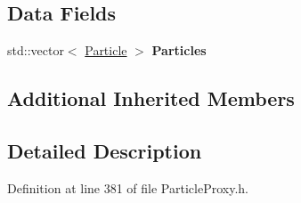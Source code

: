 \subsection*{Data Fields}
\begin{DoxyCompactItemize}
\item 
std\+::vector$<$ \hyperlink{class_particle}{Particle} $>$ {\bfseries Particles}\hypertarget{class_snow_particle_proxy_a3a46d5c4f047110ed32894f64cdfe5a7}{}\label{class_snow_particle_proxy_a3a46d5c4f047110ed32894f64cdfe5a7}

\end{DoxyCompactItemize}
\subsection*{Additional Inherited Members}


\subsection{Detailed Description}


Definition at line 381 of file Particle\+Proxy.\+h.

